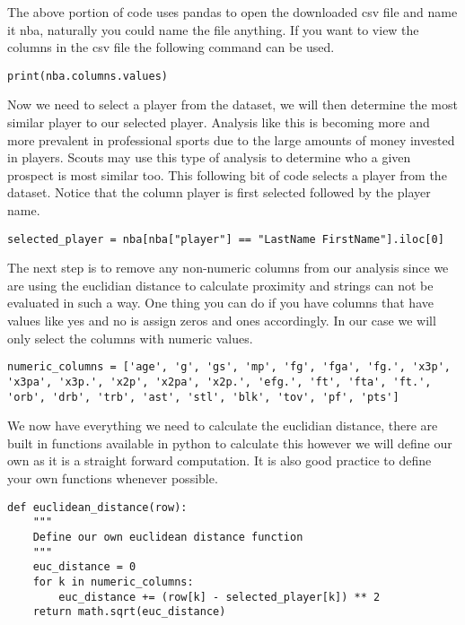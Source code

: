 The above portion of code uses pandas to open the downloaded csv file
and name it nba, naturally you could name the file anything. If you
want to view the columns in the csv file the following command can be
used.

\begin{lstlisting}
print(nba.columns.values)
\end{lstlisting} 

Now we need to select a player from the dataset, we will then
determine the most similar player to our selected player. Analysis
like this is becoming more and more prevalent in professional sports
due to the large amounts of money invested in players. Scouts may use
this type of analysis to determine who a given prospect is most
similar too. This following bit of code selects a player from the
dataset. Notice that the column player is first selected followed by
the player name.  

\begin{lstlisting}
selected_player = nba[nba["player"] == "LastName FirstName"].iloc[0]
\end{lstlisting} 

The next step is to remove any non-numeric columns from our analysis
since we are using the euclidian distance to calculate proximity and
strings can not be evaluated in such a way. One thing you can do if
you have columns that have values like yes and no is assign zeros and
ones accordingly. In our case we will only select the columns with
numeric values. 

\begin{lstlisting}
numeric_columns = ['age', 'g', 'gs', 'mp', 'fg', 'fga', 'fg.', 'x3p',
'x3pa', 'x3p.', 'x2p', 'x2pa', 'x2p.', 'efg.', 'ft', 'fta', 'ft.',
'orb', 'drb', 'trb', 'ast', 'stl', 'blk', 'tov', 'pf', 'pts']
\end{lstlisting} 

We now have everything we need to calculate the euclidian distance,
there are built in functions available in python to calculate this
however we will define our own as it is a straight forward
computation. It is also good practice to define your own functions
whenever possible. 

\begin{lstlisting}
def euclidean_distance(row):
    """
    Define our own euclidean distance function
    """
    euc_distance = 0
    for k in numeric_columns:
        euc_distance += (row[k] - selected_player[k]) ** 2
    return math.sqrt(euc_distance)
\end{lstlisting} 

